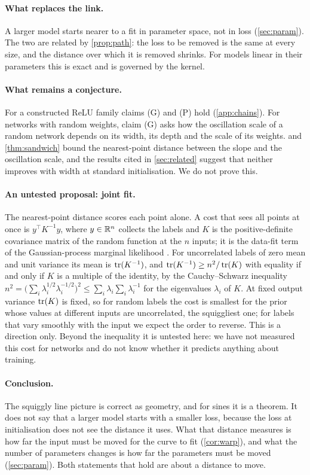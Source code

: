 \paragraph{What replaces the link.} A larger model starts nearer to a fit in
parameter space, not in loss (\cref{sec:param}). The two are related by
\cref{prop:path}: the loss to be removed is the same at every size, and the
distance over which it is removed shrinks. For models linear in their
parameters this is exact and is governed by the kernel.

\paragraph{What remains a conjecture.} For a constructed ReLU family claims (G)
and (P) hold (\cref{app:chains}). For networks with random weights, claim (G)
asks how the oscillation scale of a random network depends on its width, its
depth and the scale of its weights.  and \cref{thm:sandwich} bound the
nearest-point distance between the slope and the oscillation scale, and the
results cited in \cref{sec:related} suggest that neither improves with width at
standard initialisation. We do not prove this.

\paragraph{An untested proposal: joint fit.} The nearest-point distance scores
each point alone. A cost that sees all points at once is $y^\top K^{-1}y$, where
$y\in\mathbb{R}^n$ collects the labels and $K$ is the positive-definite covariance
matrix of the random function at the $n$ inputs; it is the data-fit term of the
Gaussian-process marginal likelihood \citep{rasmussen2006gaussian}. For
uncorrelated labels of zero mean and unit variance its mean is $\operatorname{tr}(K^{-1})$,
and $\operatorname{tr}(K^{-1})\ge n^2/\operatorname{tr}(K)$ with equality if and only if $K$ is a multiple
of the identity, by the Cauchy--Schwarz inequality
$n^2=\bigl(\sum_i\lambda_i^{1/2}\lambda_i^{-1/2}\bigr)^2\le\sum_i\lambda_i\sum_i\lambda_i^{-1}$
for the eigenvalues $\lambda_i$ of $K$. At fixed output variance $\operatorname{tr}(K)$ is
fixed, so for random labels the cost is smallest for the prior whose values at
different inputs are uncorrelated, the squiggliest one; for labels that vary
smoothly with the input we expect the order to reverse. This is a direction
only. Beyond the inequality it is untested here: we have not measured this cost
for networks and do not know whether it predicts anything about training.

\paragraph{Conclusion.} The squiggly line picture is correct as geometry, and
for sines it is a theorem. It does not say that a larger model starts with a
smaller loss, because the loss at initialisation does not see the distance it
uses. What that distance measures is how far the input must be moved for the
curve to fit (\cref{cor:warp}), and what the number of parameters changes is
how far the parameters must be moved (\cref{sec:param}). Both statements that
hold are about a distance to move.
